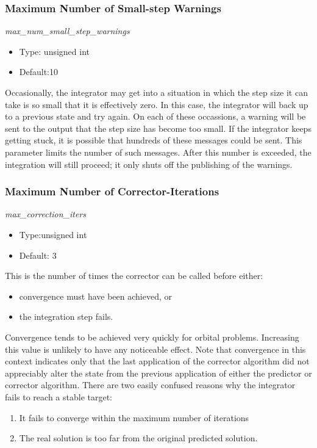 \subsubsection{Maximum Number of Small-step Warnings}
\textit{max\_num\_small\_step\_warnings}

\begin{itemize}
\item
Type: unsigned int
\item
Default:10
\end{itemize}
Occasionally, the integrator may get into a situation in which the step
size it can take is so small that it is effectively zero.  In this case,
the integrator will back up to a previous state and try again.  On each
of these occassions, a warning will be sent to the output that the step
size has become too small.  If the integrator keeps getting stuck, it
is possible that hundreds of these messages could be sent.  This parameter
limits the number of such messages.  After this number is exceeded, the
integration will still proceed; it only shuts off the publishing of the
warnings.

\subsubsection{Maximum Number of Corrector-Iterations}
\textit{max\_correction\_iters}

\begin{itemize}
\item
Type:unsigned int
\item
Default: 3
\end{itemize}
This is the number of times the corrector can be called before either:
\begin{itemize}
\item
convergence must have been achieved, or
\item
the integration step fails.
\end{itemize}

Convergence tends to be achieved very quickly for orbital problems.  Increasing
this value is unlikely to have any noticeable effect.
Note that convergence in this context indicates only that the last application
of the corrector algorithm did not appreciably alter the state from the
previous application of either the predictor or corrector algorithm.
There are two easily confused reasons why the integrator fails to reach
a stable target:
\begin{enumerate}
\item It fails to converge within the maximum number of iterations
\item The real solution is too far from the original predicted solution.
\end{enumerate}

